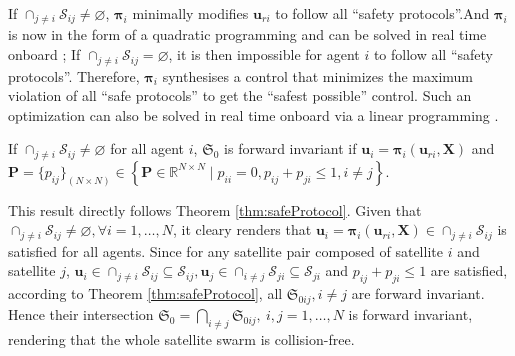 \documentclass{ifacconf}
\begin{document}
\par If $\cap_{j\neq i} \mathcal{S}_{ij} \neq \varnothing$, $\boldsymbol{\pi}_i$ minimally modifies $\boldsymbol{u}_{ri}$ to follow all ``safety protocols''.And $\boldsymbol{\pi}_i$ is now in the form of a quadratic programming and can be solved in real time onboard \cite[]{Ames2019CBFreview}; 
If $\cap_{j\neq i} \mathcal{S}_{ij} = \varnothing$, it is then impossible for agent $i$ to follow all ``safety protocols''. Therefore, $\boldsymbol{\pi}_i$ synthesises a control that minimizes the maximum violation of all ``safe protocols'' to get the ``safest possible'' control.
Such an optimization can also be solved in real time onboard via a linear programming \cite[]{Berg2011ORCA}.

\begin{thm}
   If $\cap_{j\neq i} \mathcal{S}_{ij} \neq \varnothing$ for all agent $i$, $\mathfrak{S}_0$ is forward invariant if $\boldsymbol{u}_i = \boldsymbol{\pi}_i(\boldsymbol{u}_{ri}, \boldsymbol{X})$ and $\boldsymbol{P} = \{p_{ij}\}_{(N\times N)} \in \left\{ \boldsymbol{P} \in \mathbb{R}^{N\times N} \mid p_{ii} = 0,  p_{ij} + p_{ji} \le 1, i\neq j \right\}$.
\end{thm}
\begin{pf}
   This result directly follows Theorem \ref{thm:safeProtocol}. 
   Given that $\cap_{j\neq i} \mathcal{S}_{ij} \neq \varnothing, \forall i = 1, 
   \dots, N$, it cleary renders that $\boldsymbol{u}_i = \boldsymbol{\pi}_i(\boldsymbol{u}_{ri}, \boldsymbol{X}) \in \cap_{j\neq i} \mathcal{S}_{ij}$ is satisfied for all agents.
   Since for any satellite pair composed of satellite $i$ and satellite $j$, $\boldsymbol{u}_i \in \cap_{j\neq i} \mathcal{S}_{ij} \subseteq  \mathcal{S}_{ij}, \boldsymbol{u}_j \in \cap_{i\neq j} \mathcal{S}_{ji} \subseteq  \mathcal{S}_{ji}$ and $p_{ij} + p_{ji} \le 1$ are satisfied, according to Theorem \ref{thm:safeProtocol}, all $\mathfrak{S}_{0ij}, i \neq j$ are forward invariant.
   Hence their intersection $\mathfrak{S}_0 = \bigcap_{i \neq j}\mathfrak{S}_{0ij}, ~i,j = 1, \dots, N$ is forward invariant, rendering that the whole satellite swarm is collision-free.
\end{pf}
\end{document}
